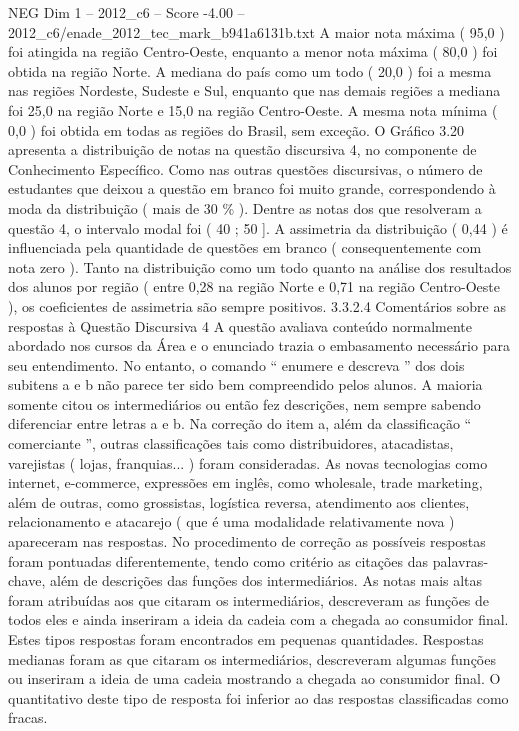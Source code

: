 \begin{textsample}{NEG Dim 1 – 2012\_c6 – Score -4.00 – 2012\_c6/enade\_2012\_tec\_mark\_b941a6131b.txt}
A maior nota máxima ( 95,0 ) foi atingida na região Centro-Oeste, enquanto a menor nota máxima ( 80,0 ) foi obtida na região Norte.
A mediana do país como um todo ( 20,0 ) foi a mesma nas regiões Nordeste, Sudeste e Sul, enquanto que nas demais regiões a mediana foi 25,0 na região Norte e 15,0 na região Centro-Oeste.
A mesma nota mínima ( 0,0 ) foi obtida em todas as regiões do Brasil, sem exceção.
O Gráfico 3.20 apresenta a distribuição de notas na questão discursiva 4, no componente de Conhecimento Específico.
Como nas outras questões discursivas, o número de estudantes que deixou a questão em branco foi muito grande, correspondendo à moda da distribuição ( mais de 30 \% ).
Dentre as notas dos que resolveram a questão 4, o intervalo modal foi ( 40 ; 50 ].
A assimetria da distribuição ( 0,44 ) é influenciada pela quantidade de questões em branco ( consequentemente com nota zero ).
Tanto na distribuição como um todo quanto na análise dos resultados dos alunos por região ( entre 0,28 na região Norte e 0,71 na região Centro-Oeste ), os coeficientes de assimetria são sempre positivos. 3.3.2.4 Comentários sobre as respostas à Questão Discursiva 4 A questão avaliava conteúdo normalmente abordado nos cursos da Área e o enunciado trazia o embasamento necessário para seu entendimento.
No entanto, o comando “ enumere e descreva ” dos dois subitens a e b não parece ter sido bem compreendido pelos alunos.
A maioria somente citou os intermediários ou então fez descrições, nem sempre sabendo diferenciar entre letras a e b.
Na correção do item a, além da classificação “ comerciante ”, outras classificações tais como distribuidores, atacadistas, varejistas ( lojas, franquias... ) foram consideradas.
As novas tecnologias como internet, e-commerce, expressões em inglês, como wholesale, trade marketing, além de outras, como grossistas, logística reversa, atendimento aos clientes, relacionamento e atacarejo ( que é uma modalidade relativamente nova ) apareceram nas respostas.
No procedimento de correção as possíveis respostas foram pontuadas diferentemente, tendo como critério as citações das palavras-chave, além de descrições das funções dos intermediários.
As notas mais altas foram atribuídas aos que citaram os intermediários, descreveram as funções de todos eles e ainda inseriram a ideia da cadeia com a chegada ao consumidor final.
Estes tipos respostas foram encontrados em pequenas quantidades.
Respostas medianas foram as que citaram os intermediários, descreveram algumas funções ou inseriram a ideia de uma cadeia mostrando a chegada ao consumidor final.
O quantitativo deste tipo de resposta foi inferior ao das respostas classificadas como fracas.

\end{textsample}

